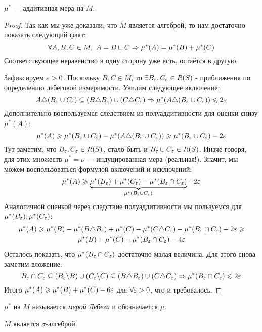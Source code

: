 \begin{theorem}
	$\mu^*$ --- аддитивная мера на $M$.
\end{theorem}

\begin{proof}
	Так как мы уже доказали, что $M$ является алгеброй, то нам достаточно показать следующий факт:
	\[
		\forall A, B, C \in M,\ A = B \sqcup C \Rightarrow \mu^*(A) = \mu^*(B) + \mu^*(C)
	\]
	Соответствующее неравенство в одну сторону уже есть, остаётся в другую.
	
	Зафиксируем $\varepsilon > 0$. Поскольку $B, C \in M$, то $\exists B_{\varepsilon}, C_{\varepsilon} \in R(S)$ - приближения по определению лебеговой измеримости. Увидим следующее включение:
	\[
		A \triangle (B_{\varepsilon} \cup C_{\varepsilon}) \subseteq (B \triangle B_{\varepsilon}) \cup (C \triangle C_{\varepsilon}) \Rightarrow \mu^*(A \triangle (B_{\varepsilon} \cup C_{\varepsilon})) \leqslant 2\varepsilon
	\]
	Дополнительно воспользуемся следствием из полуаддитивности для оценки снизу $\mu^*(A)$:
	\[
		\mu^*(A) \geqslant \mu^*(B_{\varepsilon} \cup C_{\varepsilon}) - \mu^*(A \triangle (B_{\varepsilon} \cup C_{\varepsilon})) \geqslant \mu^*(B_{\varepsilon} \cup C_{\varepsilon}) - 2\varepsilon
	\]
	Тут заметим, что $B_{\varepsilon}, C_{\varepsilon} \in R(S)$, стало быть и $B_{\varepsilon} \cup C_{\varepsilon} \in R(S)$. Иначе говоря, для этих множеств $\mu^* = \nu$ --- индуцированная мера (реальная!). Значит, мы можем воспользоваться формулой включений и исключений:
	\[
		\mu^*(A) \geqslant \underbrace{\mu^*(B_{\varepsilon}) + \mu^*(C_{\varepsilon}) - \mu^*(B_{\varepsilon} \cap C_{\varepsilon})}_{\mu^*(B_{\varepsilon} \cup C_{\varepsilon})} - 2\varepsilon
	\]
	Аналогичной оценкой через следствие полуаддитивности мы пользуемся для $\mu^*(B_{\varepsilon}), \mu^*(C_{\varepsilon})$:
	\begin{multline*}
		\mu^*(A) \geqslant \mu^*(B) - \mu^*(B \triangle B_{\varepsilon}) + \mu^*(C) - \mu^*(C \triangle C_{\varepsilon}) - \mu^*(B_{\varepsilon} \cap C_{\varepsilon}) - 2\varepsilon \geqslant
		\\
		\mu^*(B) + \mu^*(C) - \mu^*(B_{\varepsilon} \cap C_{\varepsilon}) - 4\varepsilon
	\end{multline*}
	Осталось показать, что $\mu^*(B_{\varepsilon} \cap C_{\varepsilon})$ достаточно малая величина. Для этого снова заметим вложение:
	\[
		B_{\varepsilon} \cap C_{\varepsilon} \subseteq (B_{\varepsilon} \backslash B) \cup (C_{\varepsilon} \backslash C) \subseteq (B \triangle B_{\varepsilon}) \cup (C \triangle C_{\varepsilon}) \Rightarrow \mu^*(B_{\varepsilon} \cap C_{\varepsilon}) \leqslant 2\varepsilon
	\]
	Итого $\mu^*(A) \geqslant \mu^*(B) + \mu^*(C) - 6\varepsilon$ для $\forall \varepsilon > 0$, что и требовалось.
\end{proof}

\begin{definition}
	$\mu^*$ на $M$ называется \textit{мерой Лебега} и обозначается $\mu$.
\end{definition}

\begin{theorem}
	$M$ является $\sigma$-алгеброй.
\end{theorem}

